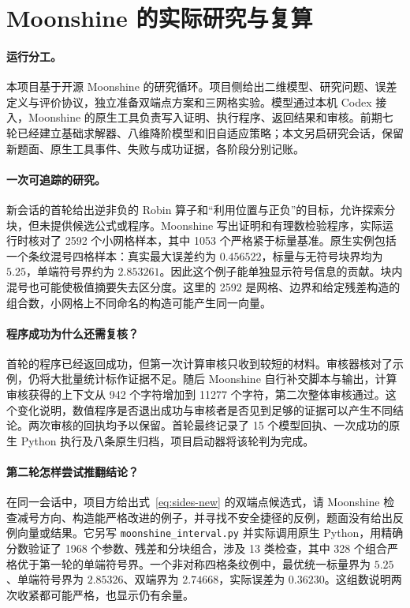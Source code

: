 \section{Moonshine 的实际研究与复算}
\paragraph{运行分工。}
本项目基于开源 Moonshine\cite{moonshine} 的研究循环。项目侧给出二维模型、研究问题、误差定义与评价协议，独立准备双端点方案和三网格实验。模型通过本机 Codex 接入，Moonshine 的原生工具负责写入证明、执行程序、返回结果和审核。前期七轮已经建立基础求解器、八维降阶模型和旧自适应策略；本文另启研究会话，保留新题面、原生工具事件、失败与成功证据，各阶段分别记账。

\paragraph{一次可追踪的研究。}
新会话的首轮给出逆非负的 Robin 算子和“利用位置与正负”的目标，允许探索分块，但未提供候选公式或程序。Moonshine 写出证明和有理数检验程序，实际运行时核对了 2592 个小网格样本，其中 1053 个严格紧于标量基准。原生实例包括一个条纹混号四格样本：真实最大误差约为 $0.456522$，标量与无符号块界均为 $5.25$，单端符号界约为 $2.853261$。因此这个例子能单独显示符号信息的贡献。块内混号也可能使极值摘要失去区分度。这里的 2592 是网格、边界和给定残差构造的组合数，小网格上不同命名的构造可能产生同一向量。

\paragraph{程序成功为什么还需复核？}
首轮的程序已经返回成功，但第一次计算审核只收到较短的材料。审核器核对了示例，仍将大批量统计标作证据不足。随后 Moonshine 自行补交脚本与输出，计算审核获得的上下文从 942 个字符增加到 11277 个字符，第二次整体审核通过。这个变化说明，数值程序是否退出成功与审核者是否见到足够的证据可以产生不同结论。两次审核的回执均予以保留。首轮最终记录了 15 个模型回执、一次成功的原生 Python 执行及八条原生归档，项目启动器将该轮判为完成。

\paragraph{第二轮怎样尝试推翻结论？}
在同一会话中，项目方给出式~\eqref{eq:sides-new} 的双端点候选式，请 Moonshine 检查减号方向、构造能严格改进的例子，并寻找不安全捷径的反例，题面没有给出反例向量或结果。它另写 \texttt{moonshine\_interval.py} 并实际调用原生 Python，用精确分数验证了 1968 个参数、残差和分块组合，涉及 13 类检查，其中 328 个组合严格优于第一轮的单端符号界。一个非对称四格条纹例中，最优统一标量界为 $5.25$、单端符号界为 $2.85326$、双端界为 $2.74668$，实际误差为 $0.36230$。这组数说明两次收紧都可能严格，也显示仍有余量。

